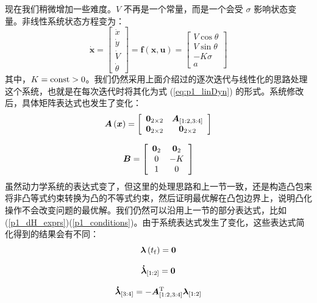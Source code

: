 \documentclass{article}
\numberwithin{equation}{section}
\begin{document}
现在我们稍微增加一些难度。$V$ 不再是一个常量，而是一个会受 $\sigma$ 影响状态变量。非线性系统状态方程变为：
\[{\bm{\dot x}} = \left[ {\begin{array}{*{20}{c}}
{\dot x}\\
{\dot y}\\
{\dot V}\\
{\dot \theta }
\end{array}} \right] = {\bm{f}}\left( {{\bm{x}},{\bm{u}}} \right) = \left[ {\begin{array}{*{20}{c}}
{V\cos \theta }\\
{V\sin \theta }\\
{ - K\sigma }\\
a
\end{array}} \right]\]
其中，$K = {\rm{const}} > 0$。我们仍然采用上面介绍过的逐次迭代与线性化的思路处理这个系统，也就是在每次迭代时将其化为式 (\ref{eq:p1_linDyn}) 的形式。系统修改后，具体矩阵表达式也发生了变化：
\[{\bm{A}}\left( {\bm{x}} \right) = \left[ {\begin{array}{*{20}{c}}
{{{\bf{0}}_{2 \times 2}}}&{{{\bm{A}}_{\left[ {1:2,3:4} \right]}}}\\
{{{\bf{0}}_{2 \times 2}}}&{{{\bf{0}}_{2 \times 2}}}
\end{array}} \right]\]

\begin{equation}
\label{p2_B}
{\bm{B}} = \left[ {\begin{array}{*{20}{c}}
{{{\bf{0}}_2}}&{{{\bf{0}}_2}}\\
0&{ - K}\\
1&0
\end{array}} \right]
\end{equation}
虽然动力学系统的表达式变了，但这里的处理思路和上一节一致，还是构造凸包来将非凸等式约束转换为凸的不等式约束，然后证明最优解在凸包边界上，说明凸化操作不会改变问题的最优解。我们仍然可以沿用上一节的部分表达式，比如 (\ref{p1_dH_exprs})(\ref{p1_conditions})。由于系统表达式发生了变化，这些表达式简化得到的结果会有不同：
\begin{equation}
\label{p2_lambdaf_eq_0}
{\bm{\lambda }}\left( {{t_{\rm{f}}}} \right) = {\bf{0}}
\end{equation}

\begin{equation}
\label{p2_dlambda1_2_eq_0}
{{{\bm{\dot \lambda }}}_{\left[ {1:2} \right]}} = {\bf{0}}
\end{equation}

\begin{equation}
\label{p2_dlambda3_4}
{{{\bm{\dot \lambda }}}_{\left[ {3:4} \right]}} =  - {\bm{A}}_{\left[ {1:2,3:4} \right]}^{\rm{T}}{{\bm{\lambda }}_{\left[ {1:2} \right]}}
\end{equation}
\end{document}
